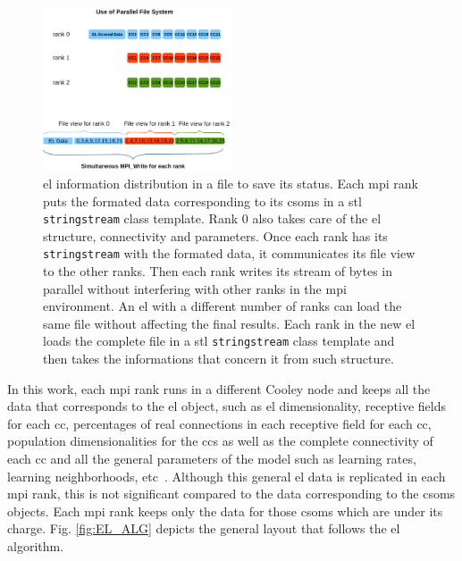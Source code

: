 \documentclass[10pt,journal,compsoc]{IEEEtran}
\begin{document}
\begin{figure}[h!]
    \centering
    \includegraphics[width=0.5\textwidth]{MPI_IO.png}
    \caption{\gls{el} information distribution in a file to save its status. Each \gls{mpi} rank puts the formated data corresponding to its \glspl{csom} in a \gls{stl} \texttt{stringstream} class template. Rank 0 also takes care of the \gls{el} structure, connectivity and parameters. Once each rank has its \texttt{stringstream} with the formated data, it communicates its file view to the other ranks. Then each rank writes its stream of bytes in parallel without interfering with other ranks in the \gls{mpi} environment. An \gls{el} with a different number of ranks can load the same file without affecting the final results. Each rank in the new \gls{el} loads the complete file in a \gls{stl} \texttt{stringstream} class template and then takes the informations that concern it from such structure.}
    \label{fig:MPI_IO}
\end{figure}

In this work, each \gls{mpi} rank runs in a different Cooley node and keeps all the data that corresponds to the \gls{el} object, such as \gls{el} dimensionality, receptive fields for each \gls{cc}, percentages of real connections in each receptive field for each \gls{cc}, population dimensionalities for the \glspl{cc} as well as the complete connectivity of each \gls{cc} and all the general parameters of the model such as learning rates, learning neighborhoods, etc~\cite{Dematties2018}. Although this general \gls{el} data is replicated in each \gls{mpi} rank, this is not significant compared to the data corresponding to the \glspl{csom} objects. Each \gls{mpi} rank keeps only the data for those \glspl{csom} which are under its charge. Fig. \ref{fig:EL_ALG} depicts the general layout that follows the \gls{el} algorithm.
\end{document}
